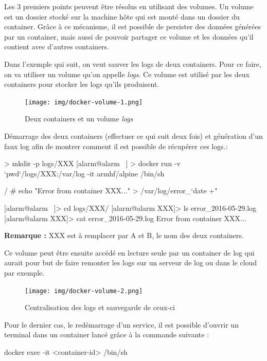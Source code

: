 \documentclass[11pt,a4paper,oneside]{report}
\begin{document}
Les 3 premiers points peuvent être résolus en utilisant des volumes. Un volume est un dossier stocké sur la machine hôte qui est monté dans un dossier du container. Grâce à ce mécanisme, il est possible de persister des données générées par un container, mais aussi de pouvoir partager ce volume et les données qu'il contient avec d'autres containers.

Dans l'exemple qui suit, on veut sauver les logs de deux containers. Pour ce faire, on va utiliser un volume qu'on appelle \textit{logs}. Ce volume est utilisé par les deux containers pour stocker les logs qu'ils produisent.

\begin{figure}[H]
\centering
\texttt{[image: img/docker-volume-1.png]}
\caption{Deux containers et un volume \textit{logs}}
\end{figure}

Démarrage des deux containers (effectuer ce qui suit deux fois) et génération d'un faux log afin de montrer comment il est possible de récupérer ces logs.:
\begin{textcode}
 > mkdir -p logs/XXX
[alarm@alarm ~] > docker run -v `pwd`/logs/XXX:/var/log -it armhf/alpine /bin/sh

/ # echo "Error from container XXX..." > /var/log/error_`date +"%

[alarm@alarm ~]> cd logs/XXX/
[alarm@alarm XXX]> ls
error_2016-05-29.log
[alarm@alarm XXX]> cat error_2016-05-29.log 
Error from container XXX...
\end{textcode}

\textbf{Remarque :} XXX est à remplacer par A et B, le nom des deux containers.

Ce volume peut être ensuite accédé en lecture seule par un container de log qui aurait pour but de faire remonter les logs sur un serveur de log ou dans le cloud par exemple.

\begin{figure}[H]
\centering
\texttt{[image: img/docker-volume-2.png]}
\caption{Centralisation des logs et sauvegarde de ceux-ci}
\end{figure}

Pour le dernier cas, le redémarrage d'un service, il est possible d'ouvrir un terminal dans un container lancé grâce à la commande suivante :
\begin{bashcode}
docker exec -it <container-id> /bin/sh
\end{bashcode}
\end{document}
